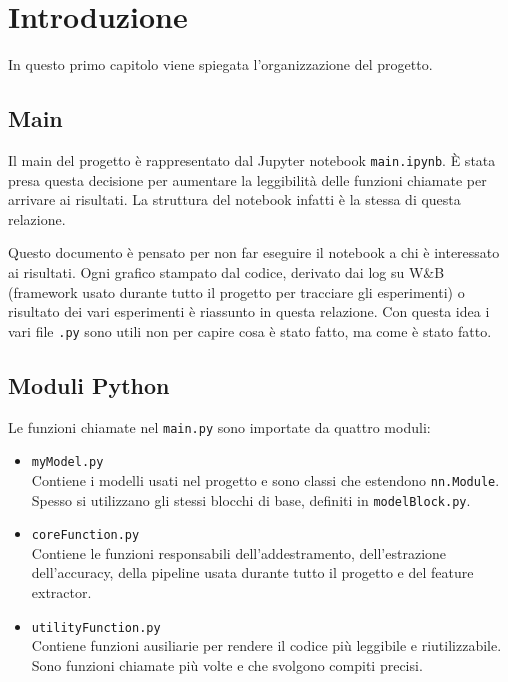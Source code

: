 \chapter{Introduzione}

In questo primo capitolo viene spiegata l'organizzazione del progetto.

\section{Main}
Il main del progetto è rappresentato dal Jupyter notebook \texttt{main.ipynb}. È stata presa questa decisione per aumentare la leggibilità delle funzioni chiamate per arrivare ai risultati. La struttura del notebook infatti è la stessa di questa relazione.

Questo documento è pensato per non far eseguire il notebook a chi è interessato ai risultati. Ogni grafico stampato dal codice, derivato dai log su W\&B \cite{wandb} (framework usato durante tutto il progetto per tracciare gli esperimenti) o risultato dei vari esperimenti è riassunto in questa relazione. Con questa idea i vari file \texttt{.py} sono utili non per capire cosa è stato fatto, ma come è stato fatto.

\section{Moduli Python}
Le funzioni chiamate nel \texttt{main.py} sono importate da quattro moduli:
\begin{itemize}
    \item \texttt{myModel.py} \\
        Contiene i modelli usati nel progetto e sono classi che estendono \texttt{nn.Module}. Spesso si utilizzano gli stessi blocchi di base, definiti in \texttt{modelBlock.py}.
    \item \texttt{coreFunction.py} \\
        Contiene le funzioni responsabili dell'addestramento, dell'estrazione dell'accuracy, della pipeline usata durante tutto il progetto e del feature extractor.
    \item \texttt{utilityFunction.py} \\
        Contiene funzioni ausiliarie per rendere il codice più leggibile e riutilizzabile. Sono funzioni chiamate più volte e che svolgono compiti precisi.
\end{itemize}